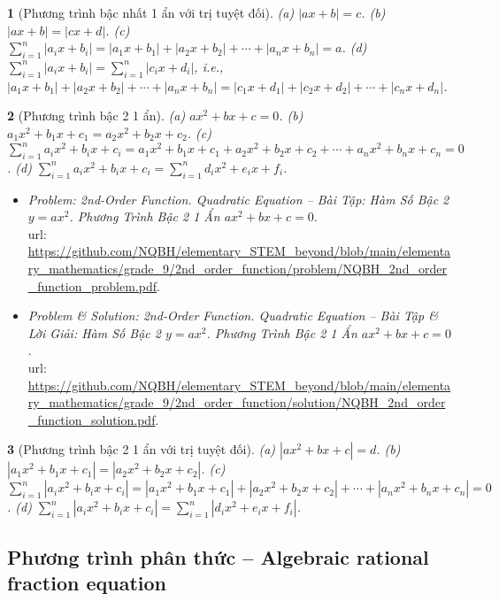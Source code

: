 \documentclass{article}
\newtheorem{baitoan}{}
\begin{document}
\begin{baitoan}[Phương trình bậc nhất 1 ẩn với trị tuyệt đối]
	(a) $|ax + b| = c$. (b) $|ax + b| = |cx + d|$. (c) $\sum_{i=1}^n |a_ix + b_i| = |a_1x + b_1| + |a_2x + b_2| + \cdots + |a_nx + b_n| = a$. (d) $\sum_{i=1}^n |a_ix + b_i| = \sum_{i=1}^n |c_ix + d_i|$, i.e., $|a_1x + b_1| + |a_2x + b_2| + \cdots + |a_nx + b_n| = |c_1x + d_1| + |c_2x + d_2| + \cdots + |c_nx + d_n|$.
\end{baitoan}

\begin{baitoan}[Phương trình bậc 2 1 ẩn]
	(a) $ax^2 + bx + c = 0$. (b) $a_1x^2 + b_1x + c_1 = a_2x^2 + b_2x + c_2$. (c) $\sum_{i=1}^n a_ix^2 + b_ix + c_i = a_1x^2 + b_1x + c_1 + a_2x^2 + b_2x + c_2 + \cdots + a_nx^2 + b_nx + c_n = 0$. (d) $\sum_{i=1}^n a_ix^2 + b_ix + c_i = \sum_{i=1}^n d_ix^2 + e_ix + f_i$.
\end{baitoan}

\begin{itemize}
	\item \textit{Problem: 2nd-Order Function. Quadratic Equation -- Bài Tập: Hàm Số Bậc 2 $y = ax^2$. Phương Trình Bậc 2 1 Ẩn $ax^2 + bx + c = 0$}.\\{\sc url}: \url{https://github.com/NQBH/elementary_STEM_beyond/blob/main/elementary_mathematics/grade_9/2nd_order_function/problem/NQBH_2nd_order_function_problem.pdf}.
	\item \textit{Problem \& Solution: 2nd-Order Function. Quadratic Equation -- Bài Tập \& Lời Giải: Hàm Số Bậc 2 $y = ax^2$. Phương Trình Bậc 2 1 Ẩn $ax^2 + bx + c = 0$}.\\{\sc url}: \url{https://github.com/NQBH/elementary_STEM_beyond/blob/main/elementary_mathematics/grade_9/2nd_order_function/solution/NQBH_2nd_order_function_solution.pdf}.
\end{itemize}

\begin{baitoan}[Phương trình bậc 2 1 ẩn với trị tuyệt đối]
	(a) $|ax^2 + bx + c| = d$. (b) $|a_1x^2 + b_1x + c_1| = |a_2x^2 + b_2x + c_2|$. (c) $\sum_{i=1}^n |a_ix^2 + b_ix + c_i| = |a_1x^2 + b_1x + c_1| + |a_2x^2 + b_2x + c_2| + \cdots + |a_nx^2 + b_nx + c_n| = 0$. (d) $\sum_{i=1}^n |a_ix^2 + b_ix + c_i| = \sum_{i=1}^n |d_ix^2 + e_ix + f_i|$.
\end{baitoan}

\subsection{Phương trình phân thức -- Algebraic rational fraction equation}
\end{document}
